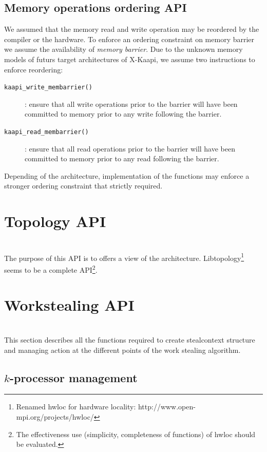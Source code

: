 \documentclass[12pt]{report}
\newcommand{\kaapi}{\textsc{X}-Kaapi\xspace}
\begin{document}
\subsection{Memory operations ordering API}
We assumed that the memory read and write operation may be reordered by the compiler or the hardware. To enforce an ordering constraint on memory barrier we assume the availability of \textit{memory barrier}. Due to the unknown memory models of futurs target architectures of \kaapi, we assume two instructions to enforce reordering:
\begin{description}
\item [\texttt{kaapi\_write\_membarrier()}]: ensure that all  write operations prior to the barrier will have been committed to memory prior to any write following the barrier.
\item [\texttt{kaapi\_read\_membarrier()}]: ensure that all  read operations prior to the barrier will have been committed to memory prior to any read following the barrier.
\end{description}
Depending of the architecture, implementation of the functions may enforce a stronger ordering constraint that strictly required.


\section{Topology API}
\\

The purpose of this API is to offers a view of the architecture. Libtopology\footnote{Renamed hwloc for hardware locality: http://www.open-mpi.org/projects/hwloc/} seems to be a complete API\footnote{The effectiveness use (simplicity, completeness of functions) of hwloc should be evaluated.}.

\section{Workstealing API}
\\

This section describes all the functions required to create stealcontext structure and managing action at the different points of the work stealing algorithm.


\subsection{$k$-processor management}
\end{document}
